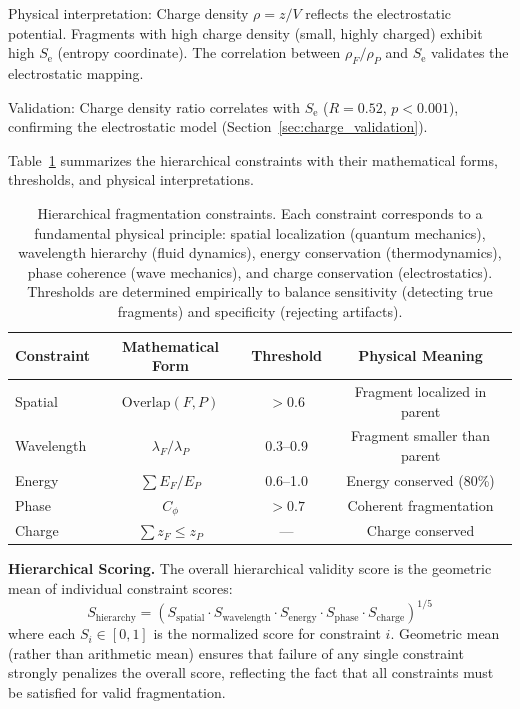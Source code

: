 \documentclass[11pt,twocolumn]{article}
\newcommand{\Se}{S_{\text{e}}}
\begin{document}
Physical interpretation: Charge density $\rho = z/V$ reflects the electrostatic potential. Fragments with high charge density (small, highly charged) exhibit high $\Se$ (entropy coordinate). The correlation between $\rho_F / \rho_P$ and $\Se$ validates the electrostatic mapping.

Validation: Charge density ratio correlates with $\Se$ ($R = 0.52$, $p < 0.001$), confirming the electrostatic model (Section~\ref{sec:charge_validation}).

Table~\ref{tab:constraints} summarizes the hierarchical constraints with their mathematical forms, thresholds, and physical interpretations.

\begin{table}[h]
\centering
\caption{Hierarchical fragmentation constraints. Each constraint corresponds to a fundamental physical principle: spatial localization (quantum mechanics), wavelength hierarchy (fluid dynamics), energy conservation (thermodynamics), phase coherence (wave mechanics), and charge conservation (electrostatics). Thresholds are determined empirically to balance sensitivity (detecting true fragments) and specificity (rejecting artifacts).}
\label{tab:constraints}
\begin{tabular}{@{}lccc@{}}
\toprule
Constraint & Mathematical Form & Threshold & Physical Meaning \\
\midrule
Spatial & $\text{Overlap}(F,P)$ & $>0.6$ & Fragment localized in parent \\
Wavelength & $\lambda_F/\lambda_P$ & 0.3--0.9 & Fragment smaller than parent \\
Energy & $\sum E_F/E_P$ & 0.6--1.0 & Energy conserved (80\%) \\
Phase & $C_\phi$ & $>0.7$ & Coherent fragmentation \\
Charge & $\sum z_F \leq z_P$ & --- & Charge conserved \\
\bottomrule
\end{tabular}
\end{table}

\textbf{Hierarchical Scoring.} The overall hierarchical validity score is the geometric mean of individual constraint scores:
\begin{equation}
    S_{\text{hierarchy}} = \left( S_{\text{spatial}} \cdot S_{\text{wavelength}} \cdot S_{\text{energy}} \cdot S_{\text{phase}} \cdot S_{\text{charge}} \right)^{1/5}
    \label{eq:hierarchy_score}
\end{equation}
where each $S_i \in [0, 1]$ is the normalized score for constraint $i$. Geometric mean (rather than arithmetic mean) ensures that failure of any single constraint strongly penalizes the overall score, reflecting the fact that all constraints must be satisfied for valid fragmentation.
\end{document}
